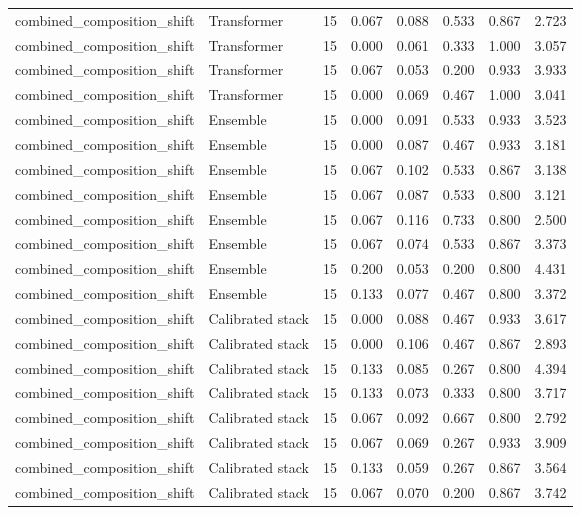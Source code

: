 {\begin{longtable}{llrrrrrr}
combined\_composition\_shift & Transformer & 15 & 0.067 & 0.088 & 0.533 & 0.867 & 2.723 \\
combined\_composition\_shift & Transformer & 15 & 0.000 & 0.061 & 0.333 & 1.000 & 3.057 \\
combined\_composition\_shift & Transformer & 15 & 0.067 & 0.053 & 0.200 & 0.933 & 3.933 \\
combined\_composition\_shift & Transformer & 15 & 0.000 & 0.069 & 0.467 & 1.000 & 3.041 \\
combined\_composition\_shift & Ensemble & 15 & 0.000 & 0.091 & 0.533 & 0.933 & 3.523 \\
combined\_composition\_shift & Ensemble & 15 & 0.000 & 0.087 & 0.467 & 0.933 & 3.181 \\
combined\_composition\_shift & Ensemble & 15 & 0.067 & 0.102 & 0.533 & 0.867 & 3.138 \\
combined\_composition\_shift & Ensemble & 15 & 0.067 & 0.087 & 0.533 & 0.800 & 3.121 \\
combined\_composition\_shift & Ensemble & 15 & 0.067 & 0.116 & 0.733 & 0.800 & 2.500 \\
combined\_composition\_shift & Ensemble & 15 & 0.067 & 0.074 & 0.533 & 0.867 & 3.373 \\
combined\_composition\_shift & Ensemble & 15 & 0.200 & 0.053 & 0.200 & 0.800 & 4.431 \\
combined\_composition\_shift & Ensemble & 15 & 0.133 & 0.077 & 0.467 & 0.800 & 3.372 \\
combined\_composition\_shift & Calibrated stack & 15 & 0.000 & 0.088 & 0.467 & 0.933 & 3.617 \\
combined\_composition\_shift & Calibrated stack & 15 & 0.000 & 0.106 & 0.467 & 0.867 & 2.893 \\
combined\_composition\_shift & Calibrated stack & 15 & 0.133 & 0.085 & 0.267 & 0.800 & 4.394 \\
combined\_composition\_shift & Calibrated stack & 15 & 0.133 & 0.073 & 0.333 & 0.800 & 3.717 \\
combined\_composition\_shift & Calibrated stack & 15 & 0.067 & 0.092 & 0.667 & 0.800 & 2.792 \\
combined\_composition\_shift & Calibrated stack & 15 & 0.067 & 0.069 & 0.267 & 0.933 & 3.909 \\
combined\_composition\_shift & Calibrated stack & 15 & 0.133 & 0.059 & 0.267 & 0.867 & 3.564 \\
combined\_composition\_shift & Calibrated stack & 15 & 0.067 & 0.070 & 0.200 & 0.867 & 3.742 \\

\end{longtable}}
